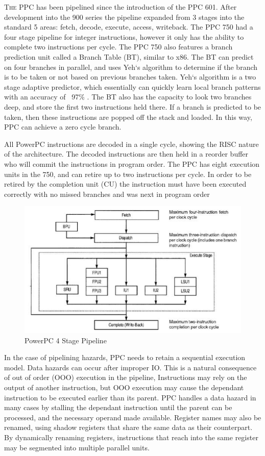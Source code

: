 \documentclass[10pt]{article}
\begin{document}
\textsc{The} PPC has been pipelined since the introduction of the PPC 601. After development into the 900 series the pipeline expanded from 3 stages into the standard 5 areas: fetch, decode, execute, access, writeback. The PPC 750 had a four stage pipeline for integer instructions, however it only has the ability to complete two instructions per cycle. The PPC 750 also features a branch prediction unit called a Branch Table (BT), similar to x86. The BT can predict on four branches in parallel, and uses Yeh`s algorithm to determine if the branch is to be taken or not based on previous branches taken. Yeh`s algorithm is a two stage adaptive predictor, which essentially can quickly learn local branch patterns with an accuracy of ~97\% . The BT also has the capacity to look two branches deep, and store the first two instructions held there. If a branch is predicted to be taken, then these instructions are popped off the stack and loaded. In this way, PPC can achieve a zero cycle branch. 
\par
All PowerPC instructions are decoded in a single cycle, showing the RISC nature of the architecture. The decoded instructions are then held in a reorder buffer who will commit the instructions in program order. The PPC has eight execution units in the 750, and can retire up to two instructions per cycle. In order to be retired by the completion unit (CU) the instruction must have been executed correctly with no missed branches and was next in program order 
\par
\begin{figure}[h]
   \centering
   \includegraphics[scale=0.5]{PPC_pipeline}
   \caption{PowerPC 4 Stage Pipeline}
\end{figure}
\par
In the case of pipelining hazards, PPC needs to retain a sequential execution model. Data hazards can occur after improper IO. This is a natural consequence of out of order (OOO) execution in the pipeline, Instructions may rely on the output of another instruction, but OOO execution may cause the dependant instruction to be executed earlier than its parent. PPC handles a data hazard in many cases by stalling the dependant instruction until the parent can be processed, and the necessary operand made available. Register names may also be renamed, using shadow registers that share the same data as their counterpart. By dynamically renaming registers, instructions that reach into the same register may be segmented into multiple parallel units. 
\end{document}
